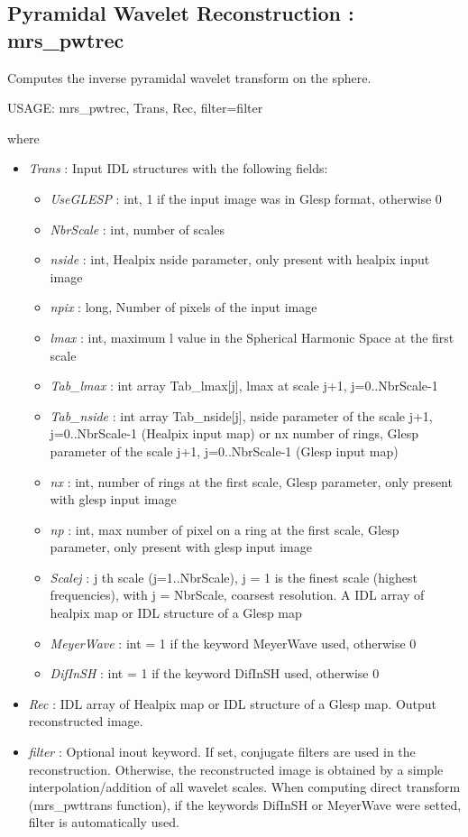 \subsection{Pyramidal Wavelet Reconstruction : mrs\_pwtrec}
Computes the inverse pyramidal wavelet transform on the sphere.
{\bf
\begin{center}
     USAGE: mrs\_pwtrec, Trans, Rec, filter=filter 
\end{center}}
where 
\begin{itemize}
\item {\em Trans} : Input IDL structures with the following fields:  
\begin{itemize}
\item {\em UseGLESP} : int, 1 if the input image was in Glesp format, otherwise 0
\item {\em NbrScale} : int, number of scales 
\item {\em nside} : int, Healpix nside parameter, only present with healpix input image
\item {\em npix} : long, Number of pixels of the input image
\item {\em lmax} : int, maximum l value in the Spherical Harmonic Space at the first scale
\item {\em Tab\_lmax} : int array Tab\_lmax[j], lmax at scale j+1, j=0..NbrScale-1
\item {\em Tab\_nside} : int array Tab\_nside[j], nside parameter of the scale j+1, j=0..NbrScale-1 (Healpix input map) 
or nx number of rings, Glesp parameter of the scale j+1, j=0..NbrScale-1 (Glesp input map)
\item {\em nx} : int, number of rings at the first scale, Glesp parameter, only present with glesp input image
\item {\em np} : int, max number of pixel on a ring at the first scale, Glesp parameter, only present with glesp input image
\item {\em Scalej} : j th scale (j=1..NbrScale), j = 1 is the finest scale (highest frequencies), 
with j = NbrScale, coarsest resolution. A IDL array of healpix map or IDL structure of a Glesp map
\item {\em MeyerWave} : int = 1 if the keyword MeyerWave used, otherwise 0
\item {\em DifInSH} : int = 1 if the keyword DifInSH used, otherwise 0
\end{itemize}
\item {\em Rec} : IDL array of Healpix map or IDL structure of a Glesp map. Output reconstructed image.  
\item {\em filter} : Optional inout keyword. If set, conjugate filters are used in the reconstruction. Otherwise, the reconstructed 
image is obtained by a simple interpolation/addition of all wavelet scales. When computing direct transform (mrs\_pwttrans function), 
if the keywords DifInSH or MeyerWave were setted, filter is automatically used.
\end{itemize}

